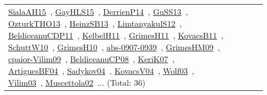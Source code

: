 {\begin{longtable}{lp{3cm}>{\raggedright\arraybackslash}p{6cm}>{\raggedright\arraybackslash}p{6cm}>{\raggedright\arraybackslash}p{8cm}}
\href{papers/SialaAH15.pdf}{SialaAH15}~\cite{SialaAH15}, \href{papers/GayHLS15.pdf}{GayHLS15}~\cite{GayHLS15}, \href{papers/DerrienP14.pdf}{DerrienP14}~\cite{DerrienP14}, \href{papers/GuSS13.pdf}{GuSS13}~\cite{GuSS13}, \href{articles/OzturkTHO13.pdf}{OzturkTHO13}~\cite{OzturkTHO13}, \href{articles/HeinzSB13.pdf}{HeinzSB13}~\cite{HeinzSB13}, \href{articles/LimtanyakulS12.pdf}{LimtanyakulS12}~\cite{LimtanyakulS12}, \href{articles/BeldiceanuCDP11.pdf}{BeldiceanuCDP11}~\cite{BeldiceanuCDP11}, \href{articles/KelbelH11.pdf}{KelbelH11}~\cite{KelbelH11}, \href{papers/GrimesH11.pdf}{GrimesH11}~\cite{GrimesH11}, \href{articles/KovacsB11.pdf}{KovacsB11}~\cite{KovacsB11}, \href{papers/SchuttW10.pdf}{SchuttW10}~\cite{SchuttW10}, \href{papers/GrimesH10.pdf}{GrimesH10}~\cite{GrimesH10}, \href{articles/abs-0907-0939.pdf}{abs-0907-0939}~\cite{abs-0907-0939}, \href{papers/GrimesHM09.pdf}{GrimesHM09}~\cite{GrimesHM09}, \href{papers/cpaior-Vilim09.pdf}{cpaior-Vilim09}~\cite{cpaior-Vilim09}, \href{papers/BeldiceanuCP08.pdf}{BeldiceanuCP08}~\cite{BeldiceanuCP08}, \href{papers/KeriK07.pdf}{KeriK07}~\cite{KeriK07}, \href{papers/ArtiguesBF04.pdf}{ArtiguesBF04}~\cite{ArtiguesBF04}, \href{papers/Sadykov04.pdf}{Sadykov04}~\cite{Sadykov04}, \href{papers/KovacsV04.pdf}{KovacsV04}~\cite{KovacsV04}, \href{papers/Wolf03.pdf}{Wolf03}~\cite{Wolf03}, \href{papers/Vilim03.pdf}{Vilim03}~\cite{Vilim03}, \href{papers/Muscettola02.pdf}{Muscettola02}~\cite{Muscettola02}... (Total: 36)\\

\end{longtable}}
